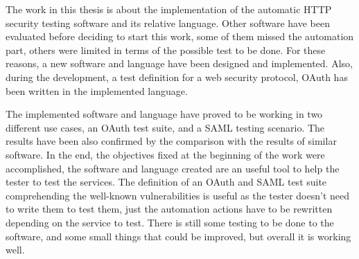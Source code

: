 The work in this thesis is about the implementation of the automatic HTTP security testing software and its relative language. Other software have been evaluated before deciding to start this work, some of them missed the automation part, others were limited in terms of the possible test to be done. For these reasons, a new software and language have been designed and implemented. Also, during the development, a test definition for a web security protocol, \gls{OAuth} has been written in the implemented language.

The implemented software and language have proved to be working in two different use cases, an OAuth test suite, and a SAML testing scenario. The results have been also confirmed by the comparison with the results of similar software. In the end, the objectives fixed at the beginning of the work were accomplished, the software and language created are an useful tool to help the tester to test the services. The definition of an OAuth and SAML test suite comprehending the well-known vulnerabilities is useful as the tester doesn't need to write them to test them, just the automation actions have to be rewritten depending on the service to test. There is still some testing to be done to the software, and some small things that could be improved, but overall it is working well.





